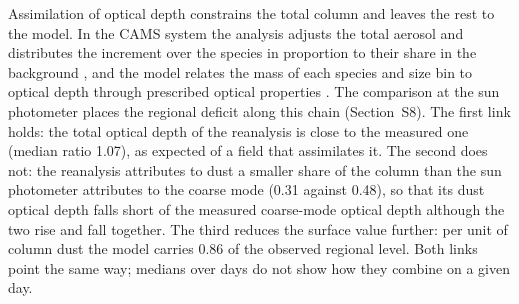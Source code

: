 Assimilation of optical depth constrains the total column and leaves the rest to the model. In the
CAMS system the analysis adjusts the total aerosol and distributes the increment over the species
in proportion to their share in the background \citep{inness2019}, and the model relates the mass
of each species and size bin to optical depth through prescribed optical properties
\citep{morcrette2009}. The comparison at the sun photometer places the regional deficit along this
chain (Section~S8). The first link holds: the total optical depth of the reanalysis is close to the
measured one (median ratio 1.07), as expected of a field that assimilates it. The second does not:
the reanalysis attributes to dust a smaller share of the column than the sun photometer attributes
to the coarse mode (0.31 against 0.48), so that its dust optical depth falls short of the measured
coarse-mode optical depth although the two rise and fall together. The third reduces the surface
value further: per unit of column dust the model carries 0.86 of the observed regional level. Both
links point the same way; medians over days do not show how they combine on a given day.

